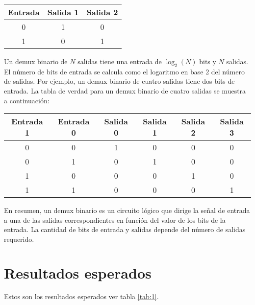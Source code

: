 \documentclass{article}
\begin{document}
\begin{multicols}{2}
\begin{table}[H]
	\centering	
	\begin{tabular}{|c|c|c|}
	\hline
	Entrada & Salida 1 & Salida 2 \\
	\hline
	0 & 1 & 0 \\
	\hline
	1 & 0 & 1 \\
	\hline
	\end{tabular}
\end{table}

Un demux binario de $N$ salidas tiene una entrada de $\log_2(N)$ bits y $N$ salidas. El número de bits de entrada se calcula como el logaritmo en base 2 del número de salidas. Por ejemplo, un demux binario de cuatro salidas tiene dos bits de entrada. La tabla de verdad para un demux binario de cuatro salidas se muestra a continuación:

\begin{table}[H]
	\centering	
	\begin{tabular}{|c|c|c|c|c|c|}
	\hline
	Entrada 1 & Entrada 0 & Salida 0 & Salida 1 & Salida 2 & Salida 3 \\
	\hline
	0 & 0 & 1 & 0 & 0 & 0 \\
	\hline
	0 & 1 & 0 & 1 & 0 & 0 \\
	\hline
	1 & 0 & 0 & 0 & 1 & 0 \\
	\hline
	1 & 1 & 0 & 0 & 0 & 1 \\
	\hline
	\end{tabular}

\end{table}	
En resumen, un demux binario es un circuito lógico que dirige la señal de entrada a una de las salidas correspondientes en función del valor de los bits de la entrada. La cantidad de bits de entrada y salidas depende del número de salidas requerido.

\end{multicols}
\section{Resultados esperados}\label{sec:resEsperados}
Estos son los resultados esperados ver tabla \ref{tab:1}.
\end{document}
